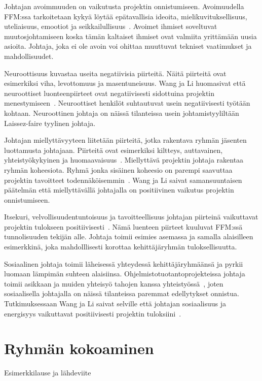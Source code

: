 \documentclass[finnish]{tktltiki2}
\theoremstyle{definition}
\theoremstyle{remark}
\begin{document}
Johtajan avoimmuuden on vaikutusta projektin onnistumiseen. Avoimuudella FFM:ssa tarkoitetaan kykyä löytää epätavallisia ideoita, mielikuvituksellisuus, uteliaisuus, emootiot ja seikkailullisuus~\cite{Wang:2009:PMP:1639950.1640049}. Avoimet ihmiset soveltuvat muutosjohtamiseen koska tämän kaltaiset ihmiset ovat valmiita yrittämään uusia asioita. Johtaja, joka ei ole avoin voi ohittaa muuttuvat tekniset vaatimukset ja mahdollisuudet. 

Neuroottisuus kuvastaa useita negatiivisia piirteitä. Näitä piirteitä ovat esimerkiksi viha, levottomuus ja masentuneisuus. Wang ja Li huomasivat että neuroottiset luonteenpiirteet ovat negatiivisesti sidottuina projektin menestymiseen~\cite{Wang:2009:PMP:1639950.1640049}. Neuroottiset henkilöt suhtautuvat usein negatiivisesti työtään kohtaan. Neuroottinen johtaja on näissä tilanteissa usein johtamistyyliltään Laissez-faire tyylinen johtaja.

Johtajan miellyttävyyteen liitetään piirteitä, jotka rakentava ryhmän jäsenten luottamusta johtajaan. Piirteitä ovat esimerkiksi kiltteys, auttavainen, yhteistyökykyinen ja huomaavaisuus~\cite{Wang:2009:PMP:1639950.1640049}. Miellyttävä projektin johtaja rakentaa ryhmän koheesiota. Ryhmä jonka sisäinen koheesio on parempi saavuttaa projektin tavoitteet todennäköisemmin~\cite{bahli2005group}. Wang ja Li saivat samansuuntaisen päätelmän että miellyttävällä johtajalla on positiivinen vaikutus projektin onnistumiseen.

Itsekuri, velvollisuudentuntoisuus ja tavoitteellisuus johtajan piirteinä vaikuttavat projektin tulokseen positiivisesti~\cite{Wang:2009:PMP:1639950.1640049}. Nämä luenteen piirteet kuuluvat FFM:ssä tunnolisuuden tekijän alle. Johtaja toimii esimies asemassa ja samalla alaisilleen esimerkkinä, joka mahdolllisesti korottaa kehittäjäryhmän tuloksellisuutta. 

Sosiaalinen johtaja toimii läheisessä yhteydessä kehittäjäryhmäänsä ja pyrkii luomaan lämpimän suhteen alaisiinsa. Ohjelmistotuotantoprojekteissa johtaja toimii asikkaan ja muiden yhteisyö tahojen kanssa yhteistyössä~\cite{McLeod:2011:FAS:1978802.1978803}, joten sosiaalisella johtajalla on näissä tilanteissa paremmat edellytykset onnistua. Tutkimuksessaan Wang ja Li saivat selville että johtajan sosiaalisuus ja energisyys vaikuttavat positiivisesti  projektin tuloksiini~\cite{Wang:2009:PMP:1639950.1640049}. 



\section{Ryhmän kokoaminen}
Esimerkkilause ja lähdeviite~\cite{4755768}
\end{document}
